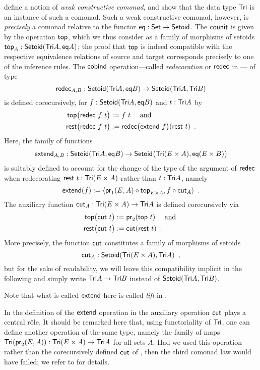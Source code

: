 \documentclass{amsart}
\begin{document}
\begin{example}
\noindent
\textcite{DBLP:conf/types/MatthesP11} define a notion of \emph{weak constructive comonad}, and show that the data type $\Tri$
  is an instance of such a comonad. 
  Such a weak constructive comonad, however, is \emph{precisely}
  a comonad relative to the functor $\eq : \Set\to\Setoid$.
  The $\counit$ is given by the operation $\head$, which we thus consider as a family of morphisms of setoids $\head_A : \Setoid(\Tri A, \eq A)$;
  the proof that $\head$ is indeed compatible with the respective equivalence relations of source and target corresponds
  precisely to one of the inference rules.
  The $\cobind$ operation---called \emph{redecoration} or $\redec$ in \parencite{DBLP:conf/types/MatthesP11}--- of type
   \[ \redec_{A,B} : \Setoid(\Tri A,\eq B) \to \Setoid(\Tri A,\Tri B )\] is defined 
  corecursively, for $f:\Setoid(\Tri A,\eq B)$  and $t : \Tri A$ by
      \begin{align}\head\bigl(\redec~f~t\bigr) &:= f~t \quad\text{ and } \notag\\
                     \tail\bigl(\redec~f~t\bigr) &:= \redec\bigl(\extend~f\bigr)(\tail~t) \enspace . \label{eq:rest_redec}
      \end{align}
Here, the family of functions 
     \[\extend_{A,B} : \Setoid(\Tri A,\eq B) \to \Setoid\bigr(\Tri (E \times A),\eq(E\times B)\bigr)\]
  is suitably defined to account for the change of the type of the argument of $\redec$ when redecorating $\tail~t : \Tri(E\times A)$
  rather than $t : \Tri A$, namely
  \[ \extend(f) := \langle \comp{\head_{E\times A}}{\pr_1(E,A)} , \comp{\cut_A}{f} \rangle \enspace . \]
  The auxiliary function $\cut_A : \Tri(E\times A) \to \Tri A$ is defined corecursively via
   \begin{align*}\head\bigl(\cut~t\bigr) &:= \pr_2(\head~t) \quad\text{ and } \\
                     \tail\bigl(\cut~t\bigr) &:= \cut(\tail~t) \enspace . 
      \end{align*}
  More precisely, the function $\cut$ constitutes a family of morphisms of setoids \[\cut_A : \Setoid(\Tri(E\times A),\Tri A) \enspace ,\]
  but for the sake of readability, we will leave this compatibility implicit in the following and simply write $\Tri A \to \Tri B$
  instead of $\Setoid(\Tri A,\Tri B)$.
  
 Note that what is called $\extend$ here is called \textit{lift} in \parencite{DBLP:conf/types/MatthesP11}.
\end{example}

\begin{remark}\label{rem:wrong_cut}
In the definition of the $\extend$ operation in  the auxiliary operation $\cut$ plays a central r\^ole.
It should be remarked here that, using functoriality of $\Tri$, one can define another operation of the same type, namely the family of 
maps $\Tri(\pr_2(E,A)) : \Tri(E\times A) \to \Tri A$ for
all sets $A$. Had we used this operation rather than the corecursively defined $\cut$ of , 
then the third comonad law would have failed; we refer to \parencite{DBLP:conf/types/MatthesS07} for details.
\end{remark}
\end{document}
